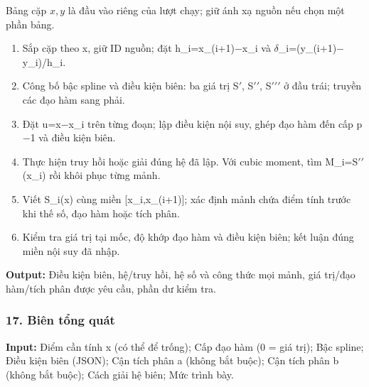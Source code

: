 Bảng cặp $x,y$ là đầu vào riêng của lượt chạy; giữ ánh xạ nguồn nếu chọn một phần bảng.

\begin{enumerate}

\item Sắp cặp theo x,\allowbreak{} giữ ID nguồn;\allowbreak{} đặt h\_i=\allowbreak{}x\_(\allowbreak{}i+\allowbreak{}1)\ensuremath{-}x\_i và \ensuremath{\delta}\_i=\allowbreak{}(\allowbreak{}y\_(\allowbreak{}i+\allowbreak{}1)\ensuremath{-}y\_i)/\allowbreak{}h\_i.

\item Công bố bậc spline và điều kiện biên: ba giá trị S\ensuremath{\prime},\allowbreak{} S\ensuremath{\prime\prime},\allowbreak{} S\ensuremath{\prime\prime\prime} ở đầu trái;\allowbreak{} truyền các đạo hàm sang phải.

\item Đặt u=\allowbreak{}x\ensuremath{-}x\_i trên từng đoạn;\allowbreak{} lập điều kiện nội suy,\allowbreak{} ghép đạo hàm đến cấp p\ensuremath{-}1 và điều kiện biên.

\item Thực hiện truy hồi hoặc giải đúng hệ đã lập. Với cubic moment,\allowbreak{} tìm M\_i=\allowbreak{}S\ensuremath{\prime\prime}(\allowbreak{}x\_i) rồi khôi phục từng mảnh.

\item Viết S\_i(\allowbreak{}x) cùng miền [x\_i,\allowbreak{}x\_(\allowbreak{}i+\allowbreak{}1)];\allowbreak{} xác định mảnh chứa điểm tính trước khi thế số,\allowbreak{} đạo hàm hoặc tích phân.

\item Kiểm tra giá trị tại mốc,\allowbreak{} độ khớp đạo hàm và điều kiện biên;\allowbreak{} kết luận đúng miền nội suy đã nhập.

\end{enumerate}

\textbf{Output:} Điều kiện biên,\allowbreak{} hệ/\allowbreak{}truy hồi,\allowbreak{} hệ số và công thức mọi mảnh,\allowbreak{} giá trị/\allowbreak{}đạo hàm/\allowbreak{}tích phân được yêu cầu,\allowbreak{} phần dư kiểm tra.

\examplebreak\subsubsection*{17. Biên tổng quát}

\textbf{Input:} Điểm cần tính x (\allowbreak{}có thể để trống);\allowbreak{} Cấp đạo hàm (\allowbreak{}0 =\allowbreak{} giá trị);\allowbreak{} Bậc spline;\allowbreak{} Điều kiện biên (\allowbreak{}JSON);\allowbreak{} Cận tích phân a (\allowbreak{}không bắt buộc);\allowbreak{} Cận tích phân b (\allowbreak{}không bắt buộc);\allowbreak{} Cách giải hệ biên;\allowbreak{} Mức trình bày.

